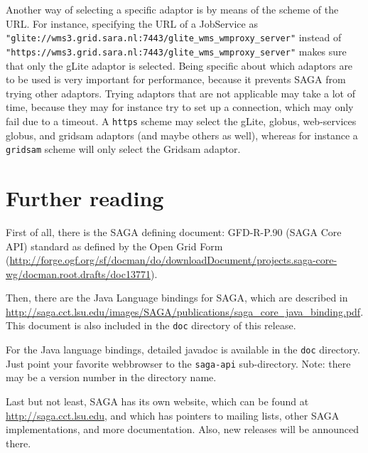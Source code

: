 \documentclass[a4paper,10pt]{article}
\begin{document}
Another way of selecting a specific adaptor is by means of the scheme of
the URL. For instance, specifying the URL of a JobService as
\texttt{"glite://wms3.grid.sara.nl:7443/glite\_wms\_wmproxy\_server"}
instead of
\texttt{"https://wms3.grid.sara.nl:7443/glite\_wms\_wmproxy\_server"}
makes sure that only the gLite adaptor is selected. Being specific about
which adaptors are to be used is very important for performance, because it
prevents SAGA from trying other adaptors. Trying adaptors that are not
applicable may take a lot of time, because they may for instance try
to set up a connection, which may only fail due to a timeout. A \texttt{https}
scheme may select the gLite, globus, web-services globus, and gridsam adaptors
(and maybe others as well), whereas for instance a \texttt{gridsam} scheme will
only select the Gridsam adaptor.

\section{Further reading}

First of all, there is the SAGA defining document:
GFD-R-P.90 (SAGA Core API) standard as defined by the
Open Grid Form (\url{http://forge.ogf.org/sf/docman/do/downloadDocument/projects.saga-core-wg/docman.root.drafts/doc13771}).

Then, there are the Java Language bindings for SAGA, which
are described in \url{http://saga.cct.lsu.edu/images/SAGA/publications/saga_core_java_binding.pdf}. This document is also included in the
\texttt{doc} directory of this release.

For the Java language bindings, detailed javadoc is available
in the \texttt{doc} directory. Just point your favorite webbrowser
to the \texttt{saga-api} sub-directory. Note: there may be a version
number in the directory name.

Last but not least, SAGA has its own website,
which can be found at \url{http://saga.cct.lsu.edu},
and which has pointers to mailing lists, other SAGA implementations,
and more documentation. Also, new releases will be announced there.
\end{document}
